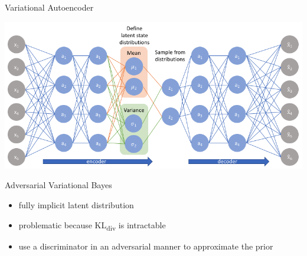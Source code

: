 \documentclass[presentation]{beamer}
\begin{document}
\begin{frame}[label={sec:org07b2fa5}]{Variational Autoencoder}
\begin{center}
\includegraphics[width=.9\linewidth]{./variational_autoencoder.png}
\end{center}
\end{frame}
\begin{frame}[label={sec:orgce1e7c8}]{Adversarial Variational Bayes}
\begin{block}{}
\begin{itemize}
\item fully implicit latent distribution
\item problematic because KL\textsubscript{div} is intractable
\item use a discriminator in an adversarial manner to approximate the prior
\end{itemize}
\end{block}
\end{frame}
\end{document}
